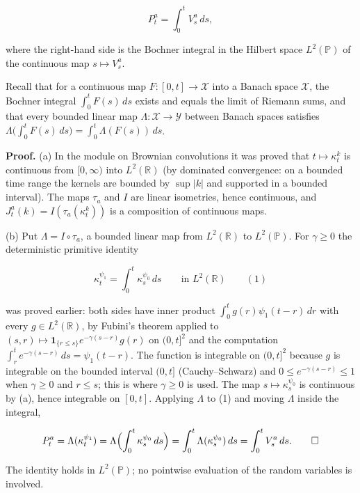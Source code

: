 \documentclass[11pt,a4paper]{article}
\begin{document}
\[P^a_t=\int_0^tV^a_s\,ds ,\]


where the right-hand side is the Bochner integral in the Hilbert space \(L^2(\mathbb P)\) of the continuous map \(s\mapsto V^a_s\).




Recall that for a continuous map \(F:[0,t]\to\mathcal X\) into a Banach space \(\mathcal X\), the Bochner integral \(\int_0^tF(s)\,ds\) exists and equals the limit of Riemann sums, and that every bounded linear map \(\Lambda:\mathcal X\to\mathcal Y\) between Banach spaces satisfies \(\Lambda\bigl(\int_0^tF(s)\,ds\bigr)=\int_0^t\Lambda(F(s))\,ds\).




\textbf{Proof.} (a) In the module on Brownian convolutions it was proved that \(t\mapsto\kappa^k_t\) is continuous from \([0,\infty)\) into \(L^2(\mathbb R)\) (by dominated convergence: on a bounded time range the kernels are bounded by \(\sup|k|\) and supported in a bounded interval). The maps \(\tau_a\) and \(I\) are linear isometries, hence continuous, and \(J^a_t(k)=I(\tau_a(\kappa^k_t))\) is a composition of continuous maps.




(b) Put \(\Lambda=I\circ\tau_a\), a bounded linear map from \(L^2(\mathbb R)\) to \(L^2(\mathbb P)\). For \(\gamma\ge0\) the deterministic primitive identity


\[\kappa^{\psi_1}_t=\int_0^t\kappa^{\psi_0}_s\,ds\qquad\text{in }L^2(\mathbb R)\qquad(1)\]


was proved earlier: both sides have inner product \(\int_0^tg(r)\psi_1(t-r)\,dr\) with every \(g\in L^2(\mathbb R)\), by Fubini's theorem applied to \((s,r)\mapsto\mathbf 1_{\{r\le s\}}e^{-\gamma(s-r)}g(r)\) on \((0,t]^2\) and the computation \(\int_r^te^{-\gamma(s-r)}\,ds=\psi_1(t-r)\). The function is integrable on \((0,t]^2\) because \(g\) is integrable on the bounded interval \((0,t]\) (Cauchy–Schwarz) and \(0\le e^{-\gamma(s-r)}\le1\) when \(\gamma\ge0\) and \(r\le s\); this is where \(\gamma\ge0\) is used. The map \(s\mapsto\kappa^{\psi_0}_s\) is continuous by (a), hence integrable on \([0,t]\). Applying \(\Lambda\) to (1) and moving \(\Lambda\) inside the integral,


\[P^a_t=\Lambda(\kappa^{\psi_1}_t)=\Lambda\Bigl(\int_0^t\kappa^{\psi_0}_s\,ds\Bigr)=\int_0^t\Lambda(\kappa^{\psi_0}_s)\,ds=\int_0^tV^a_s\,ds .\qquad\square\]


The identity holds in \(L^2(\mathbb P)\); no pointwise evaluation of the random variables is involved.
\end{document}
